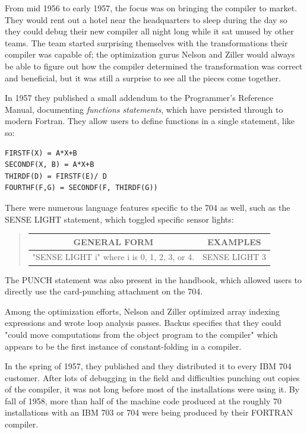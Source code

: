 From mid 1956 to early 1957, the focus was on bringing the compiler to market.
They would rent out a hotel near the headquarters to sleep during the day
so they could debug their new compiler all night long while it sat unused by other
teams.
The team started surprising themselves with the transformations their compiler
was capable of; the optimization gurus Nelson and Ziller would always be able to figure
out how the compiler determined the transformation was correct and beneficial, but
it was still a surprise to see all the pieces come together.

In 1957 they published a small addendum to the Programmer's Reference Manual,
documenting \textit{functions statements}, which have persisted through to modern Fortran.
They allow users to define functions in a single statement, like so:

\begin{lstlisting}
FIRSTF(X) = A*X+B
SECONDF(X, B) = A*X+B
THIRDF(D) = FIRSTF(E)/ D
FOURTHF(F,G) = SECONDF(F, THIRDF(G))
\end{lstlisting}

There were numerous language features specific to the 704 as well,
such as the SENSE LIGHT statement, which toggled specific sensor lights:

\begin{quotation}
	\begin{tabular}{|c|c|}
		\hline
		GENERAL FORM                                 & EXAMPLES      \\
		\hline
		"SENSE LIGHT i" where i is 0, 1, 2, 3, or 4. & SENSE LIGHT 3 \\
		\hline
	\end{tabular}
\end{quotation}

The PUNCH statement was also present in the handbook, which allowed users to
directly use the card-punching attachment on the 704.

Among the optimization efforts, Nelson and Ziller optimized array indexing expressions and
wrote loop analysis passes.
Backus specifies that they could "could move computations from the object
program to the compiler" which appears to be the first instance of
\gls{constant-folding} in a compiler.

In the spring of 1957, they published 
and they distributed it to every IBM 704 customer.
After lots of debugging in the field and difficulties punching out copies
of the compiler, it was not long before most of the installations were using it.
By fall of 1958, more than half of the machine code produced at the roughly 70 installations
with an IBM 703 or 704 were being produced by their FORTRAN compiler.


